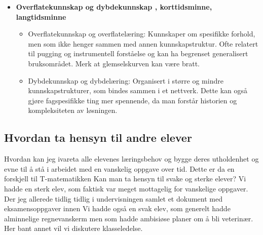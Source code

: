\documentclass[12pt,a4paper]{article}
\begin{document}
\begin{itemize}
 \item \textbf{Overflatekunnskap og dybdekunnskap , korttidsminne, langtidsminne } 
     \begin{itemize}
         \item Overflatekunnskap og overflatelæring: Kunnskaper om spesifikke forhold, men som ikke henger sammen med annen kunnskapstruktur. Ofte relatert til pugging og instrumentell forståelse og kan ha begrenset generalisert bruksområdet. Merk at
             glemselskurven kan være bratt.
         \item Dybdekunnskap og dybdelæring: Organisert i større og mindre kunnskapstrukturer, som bindes sammen i et nettverk. Dette kan også gjøre fagspesifikke ting mer spennende, da man forstår historien og kompleksiteten av løsningen. 
     \end{itemize}
     
     \end{itemize}




























     \subsection*{Hvordan ta hensyn til andre elever}%
     \label{sub:hvordan_ta_hensyn_til_andre_elever}
     
     
     
     


Hvordan kan jeg ivareta alle elevenes læringsbehov og bygge deres utholdenhet og evne til å stå i arbeidet med en vanskelig oppgave over tid. Dette er da en forskjell til T-matematikken  
Kan man  ta hensyn til svake og sterke elever?
             Vi hadde en sterk elev, som faktisk var meget mottagelig for vanskelige oppgaver. Der jeg allerede tidlig tidlig i undervisningen samlet et dokument med eksamensoppgaver innen Vi hadde også en svak elev, som generelt hadde alminnelige regnevanskerm men som hadde ambisiøse planer om å bli veterinær.
Her bant annet vil vi diskutere klasseledelse.
\end{document}
